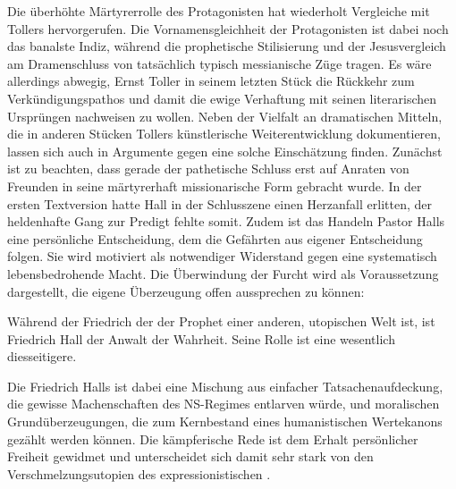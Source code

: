 Die überhöhte Märtyrerrolle des Protagonisten hat wiederholt Vergleiche mit
Tollers  hervorgerufen.  
Die Vornamensgleichheit der
Protagonisten ist dabei noch das banalste Indiz, während die prophetische
Stilisierung und der Jesusvergleich am Dramenschluss von 
tatsächlich typisch messianische Züge tragen.
Es wäre allerdings abwegig, Ernst Toller in seinem letzten Stück die Rückkehr
zum Verkündigungspathos und damit die ewige Verhaftung mit seinen
literarischen Ursprüngen nachweisen zu wollen.
Neben der Vielfalt an
dramatischen Mitteln, die in anderen Stücken Tollers künstlerische
Weiterentwicklung dokumentieren, lassen sich auch in 
Argumente gegen eine solche Einschätzung finden. Zunächst ist zu beachten,
dass gerade der pathetische Schluss erst auf Anraten von Freunden in seine
märtyrerhaft missionarische Form gebracht wurde. In der ersten Textversion hatte Hall
in der Schlusszene einen Herzanfall erlitten, der heldenhafte Gang zur Predigt
fehlte somit.   
Zudem ist das Handeln Pastor Halls eine persönliche Entscheidung, dem die
Gefährten aus eigener Entscheidung folgen. Sie wird motiviert als notwendiger 
Widerstand gegen eine systematisch lebensbedrohende Macht. Die Überwindung der
Furcht wird als Voraussetzung dargestellt, die eigene Überzeugung offen
aussprechen zu können:

\begin{BlockQuote}
Während der Friedrich der  der Prophet einer anderen,
utopischen Welt ist, ist Friedrich Hall der Anwalt der Wahrheit. Seine Rolle
ist eine wesentlich diesseitigere.
\end{BlockQuote}
Die \Cite{Wahrheit} Friedrich Halls ist dabei eine Mischung aus einfacher
Tatsachenaufdeckung, die gewisse Machenschaften des NS-Regimes entlarven
würde, und
moralischen Grundüberzeugungen, die zum Kernbestand eines humanistischen
Wertekanons gezählt werden können. Die kämpferische Rede ist dem Erhalt
persönlicher Freiheit gewidmet und unterscheidet sich damit sehr stark von den
Verschmelzungsutopien des expressionistischen
\Cite{Menschheitskultes}.

